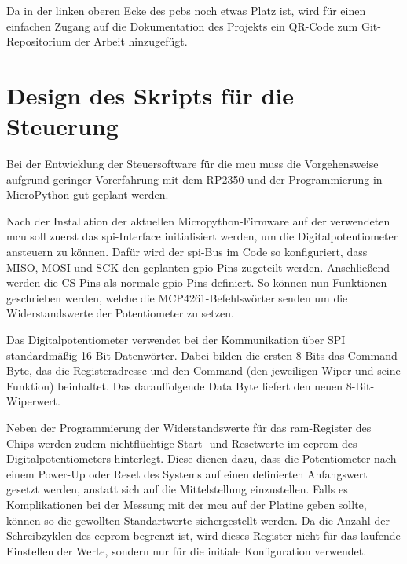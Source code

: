 \documentclass[../main_config.tex]{subfiles}
\begin{document}
Da in der linken oberen Ecke des \glspl{pcb} noch etwas Platz ist, wird für einen einfachen Zugang auf die Dokumentation des Projekts ein QR-Code zum Git-Repositorium der Arbeit hinzugefügt. 






\section{Design des Skripts für die Steuerung}

Bei der Entwicklung der Steuersoftware für die \gls{mcu} muss die Vorgehensweise aufgrund geringer Vorerfahrung mit dem RP2350 und der Programmierung in MicroPython gut geplant werden.\par
\medskip

Nach der Installation der aktuellen Micropython-Firmware auf der verwendeten \gls{mcu} soll zuerst das \gls{spi}-Interface initialisiert werden, um die Digitalpotentiometer ansteuern zu können. Dafür wird der \gls{spi}-Bus im Code so konfiguriert, dass MISO, MOSI und SCK den geplanten \gls{gpio}-Pins zugeteilt werden. Anschließend werden die CS-Pins als normale \gls{gpio}-Pins definiert. So können nun Funktionen geschrieben werden, welche die MCP4261-Befehlswörter senden um die Widerstandswerte der Potentiometer zu setzen.\par
\medskip

Das Digitalpotentiometer verwendet bei der Kommunikation über SPI standardmäßig 16-Bit-Datenwörter. Dabei bilden die ersten 8 Bits das \glqq Command Byte\grqq{}, das die Registeradresse und den Command (den jeweiligen Wiper und seine Funktion) beinhaltet. Das darauffolgende \glqq Data Byte\grqq{} liefert den neuen 8-Bit-Wiperwert.\par
\medskip

Neben der Programmierung der Widerstandswerte für das \gls{ram}-Register des Chips werden zudem nichtflüchtige Start- und Resetwerte im \gls{eeprom} des Digitalpotentiometers hinterlegt. Diese dienen dazu, dass die Potentiometer nach einem Power-Up oder Reset des Systems auf einen definierten Anfangswert gesetzt werden, anstatt sich auf die Mittelstellung einzustellen. Falls es Komplikationen bei der Messung mit der \gls{mcu} auf der Platine geben sollte, können so die gewollten Standartwerte sichergestellt werden. Da die Anzahl der Schreibzyklen des \gls{eeprom} begrenzt ist, wird dieses Register nicht für das laufende Einstellen der Werte, sondern nur für die initiale Konfiguration verwendet.\par
\medskip
\end{document}
